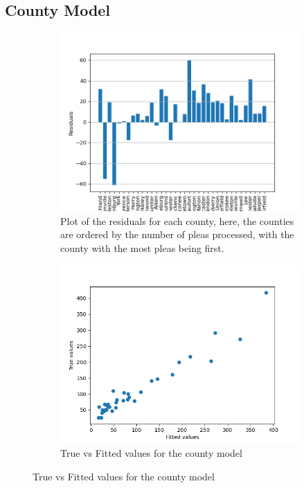 \documentclass[11pt]{article}
\begin{document}
  \subsection{County Model}
    \begin{figure}[H]
      \centering
        \begin{subfigure}[b]{0.45\textwidth}
          \includegraphics[width=\textwidth]{../../../output/figures/Exploration/resid_plot_County.png}
          \caption{Plot of the residuals for each county, here, the counties are ordered by the number of pleas processed, with the county with the most pleas being first. }
        \end{subfigure}
        \hfill
        \begin{subfigure}[b]{0.45\textwidth}
          \includegraphics[width=\textwidth]{../../../output/figures/Exploration/true_vs_fitted_County.png}
          \caption{True vs Fitted values for the county model}

        \end{subfigure}
        \label{county-figs}
    \end{figure}
\end{document}
